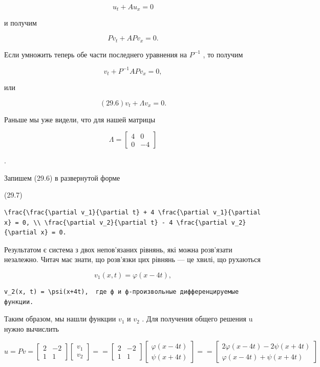\documentclass[
  ukrainian,
]{article}
\begin{document}
\[
u_t + Au_x = 0
\]

и получим

\[
Pv_t + APv_x = 0.
\]

Если умножить теперь обе части последнего уравнения на \(P^{-1}\) , то
получим

\[
v_t + P^{-1}APv_x = 0,
\]

или

\[
(29.6) v_t + \Lambda v_x = 0.
\]

Раньше мы уже видели, что для нашей матрицы

\[
\Lambda =
\begin{bmatrix} 4 & 0 \\ 0 & -4 \end{bmatrix}
\]

.

Запишем (29.6) в развернутой форме

(29.7)

\begin{verbatim}
\frac{\frac{\partial v_1}{\partial t} + 4 \frac{\partial v_1}{\partial x} = 0, \\ \frac{\partial v_2}{\partial t} - 4 \frac{\partial v_2}{\partial x} = 0.
\end{verbatim}

Результатом є система з двох непов'язаних рівнянь, які можна розв'язати
незалежно. Читач має знати, що розв'язки цих рівнянь --- це хвилі, що
рухаються

\[
v_1(x, t) = \varphi(x-4t),
\]

\begin{verbatim}
v_2(x, t) = \psi(x+4t),  где ф и ф-произвольные дифференцируемые функции.
\end{verbatim}

Таким образом, мы нашли функции \(v_1\) и \(v_2\) . Для получения общего
решения u нужно вычислить

\[
u = Pv =
\begin{bmatrix} 2 & -2 \\ 1 & 1 \end{bmatrix}
\begin{bmatrix} v_1 \\ v_2 \end{bmatrix}
=
=
\begin{bmatrix} 2 & -2 \\ 1 & 1 \end{bmatrix}
\begin{bmatrix} \varphi(x - 4t) \\ \psi(x + 4t) \end{bmatrix}
=
=
\begin{bmatrix} 2\varphi(x - 4t) - 2\psi(x + 4t) \\ \varphi(x - 4t) + \psi(x + 4t) \end{bmatrix}
\]
\end{document}
